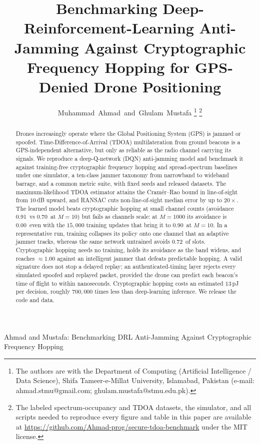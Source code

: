 \documentclass[journal]{IEEEtran}
\newcommand{\cryptoLearnHi}{1.00}     %
\newcommand{\dqnBudgetTen}{0.91}
\newcommand{\cryptoScale}{0.70}
\newcommand{\dqnStepTen}{0.90}
\newcommand{\dqnStepKilo}{0.00}
\newcommand{\collapseUntrained}{0.72} %
\begin{document}
\title{Benchmarking Deep-Reinforcement-Learning Anti-Jamming Against
Cryptographic Frequency Hopping for GPS-Denied Drone Positioning}

\author{Muhammad~Ahmad~and~Ghulam~Mustafa%
\thanks{The authors are with the Department of Computing (Artificial
Intelligence / Data Science), Shifa Tameer-e-Millat University, Islamabad,
Pakistan (e-mail: ahmad.stmu@gmail.com; ghulam.mustafa@stmu.edu.pk).}%
\thanks{The labeled spectrum-occupancy and TDOA datasets, the simulator, and
all scripts needed to reproduce every figure and table in this paper are
available at \url{https://github.com/Ahmad-prog/secure-tdoa-benchmark} under
the MIT license.}}

%
{Ahmad and Mustafa: Benchmarking DRL Anti-Jamming Against Cryptographic Frequency Hopping}

\maketitle

\begin{abstract}
Drones increasingly operate where the Global Positioning System (GPS) is jammed
or spoofed. Time-Difference-of-Arrival (TDOA) multilateration from ground
beacons is a GPS-independent alternative, but only as reliable as the radio
channel carrying its signals. We reproduce a deep-Q-network (DQN) anti-jamming
model and benchmark it against training-free cryptographic frequency hopping and
spread-spectrum baselines under one simulator, a ten-class jammer taxonomy from
narrowband to wideband barrage, and a common metric suite, with fixed seeds and
released datasets. The maximum-likelihood TDOA estimator attains the
Cram\'er--Rao bound in line-of-sight from $10$\,dB upward, and RANSAC cuts
non-line-of-sight median error by up to $20\times$. The learned model beats
cryptographic hopping at small channel counts (avoidance \dqnBudgetTen\ vs
\cryptoScale\ at $M{=}10$) but fails as channels scale: at $M{=}1000$ its
avoidance is \dqnStepKilo\ even with the $15{,}000$ training updates that bring
it to \dqnStepTen\ at $M{=}10$. In a representative run, training collapses its
policy onto one channel that an adaptive jammer tracks, whereas the same network
untrained avoids \collapseUntrained\ of slots. Cryptographic hopping needs no
training, holds its avoidance as the band widens, and reaches
$\approx\!\cryptoLearnHi$ against an intelligent jammer that defeats predictable
hopping. A valid signature does not stop a delayed replay; an
authenticated-timing layer rejects every simulated spoofed and replayed packet,
provided the drone can predict each beacon's time of flight to within
nanoseconds. Cryptographic hopping costs an estimated $13$\,pJ per decision,
roughly $700{,}000$ times less than deep-learning inference. We release the code
and data.
\end{abstract}
\end{document}
